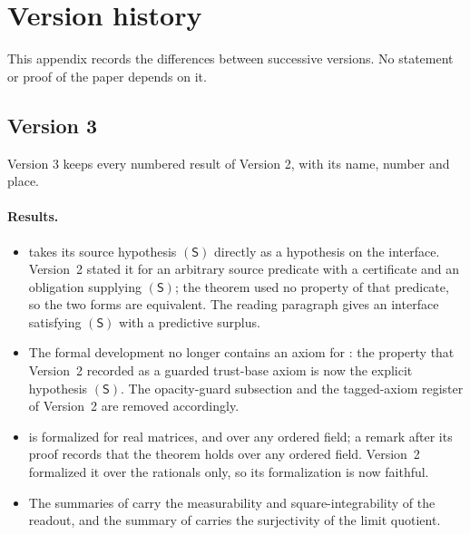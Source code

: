 \section{Version history}\label{app:version-history}

This appendix records the differences between successive versions.  No
statement or proof of the paper depends on it.

\subsection{Version 3}\label{subsec:version-3}

Version 3 keeps every numbered result of Version 2, with its name,
number and place.

\paragraph{Results.}
\begin{itemize}
\item {} takes its source hypothesis \((\mathsf S)\)
  directly as a hypothesis on the interface.  Version~2 stated it for an
  arbitrary source predicate with a certificate and an obligation
  supplying \((\mathsf S)\); the theorem used no property of that
  predicate, so the two forms are equivalent.  The reading paragraph
  gives an interface satisfying \((\mathsf S)\) with a predictive
  surplus.
\item The formal development no longer contains an axiom for
  : the property that Version~2 recorded as a guarded
  trust-base axiom is now the explicit hypothesis \((\mathsf S)\).  The
  opacity-guard subsection and the tagged-axiom register of
  Version~2 are removed accordingly.
\item {} is formalized for real matrices, and over any
  ordered field; a remark after its proof records that the theorem holds
  over any ordered field.  Version~2 formalized it over the rationals
  only, so its formalization is now faithful.
\item The summaries of  carry the measurability and
  square-integrability of the readout, and the summary of 
  carries the surjectivity of the limit quotient.
\end{itemize}

